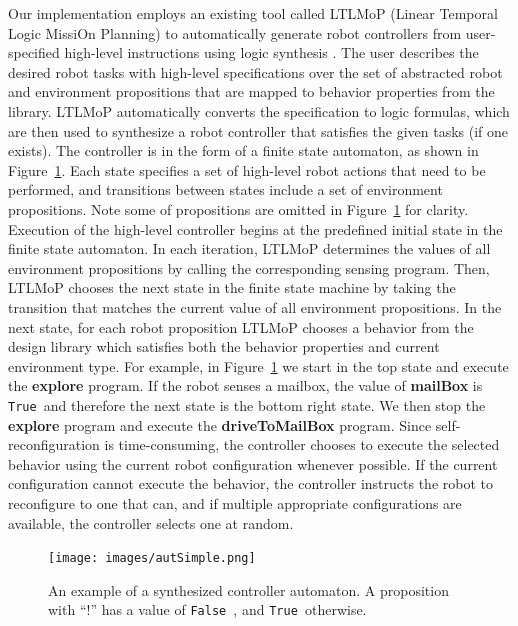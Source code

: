 \documentclass[journal]{IEEEtran}
\newcommand{\lt}{{\tt True }}
\newcommand{\lf}{{\tt False }}
\begin{document}
Our implementation employs an existing tool called LTLMoP (Linear Temporal Logic MissiOn Planning) to automatically generate robot controllers from user-specified high-level instructions using logic synthesis \cite{DBLP:conf/iros/FinucaneJK10,DBLP:journals/trob/Kress-GazitFP09}.
The user describes the desired robot tasks with high-level specifications over the set of abstracted robot and environment propositions that are mapped to behavior properties from the library.
LTLMoP automatically converts the specification to logic formulas, which are then used to synthesize a robot controller that satisfies the given tasks (if one exists).
The controller is in the form of a finite state automaton, as shown in Figure~\ref{fig:autSimple}.
Each state specifies a set of high-level robot actions that need to be performed, and transitions between states include a set of environment propositions.
Note some of propositions are omitted in Figure~\ref{fig:autSimple} for clarity.
Execution of the high-level controller begins at the predefined initial state in the finite state automaton. In each iteration, LTLMoP determines the values of all environment propositions by calling the corresponding sensing program. Then, LTLMoP chooses the next state in the finite state machine by taking the transition that matches the current value of all environment propositions. 
In the next state, for each robot proposition LTLMoP chooses a behavior from the design library which satisfies both the behavior properties and current environment type.
For example, in Figure~\ref{fig:autSimple} we start in the top state and execute the \textbf{explore} program.
If  the robot senses a mailbox, the value of \textbf{mailBox} is \lt and therefore the next state is the bottom right state. We then stop the \textbf{explore} program and execute the \textbf{driveToMailBox} program.
Since self-reconfiguration is time-consuming, the controller chooses to execute the selected behavior using the current robot configuration whenever possible.
If the current configuration cannot execute the behavior, the controller instructs the robot to reconfigure to one that can, and if multiple appropriate configurations are available, the controller selects one at random.

\begin{figure}
\begin{center}
\texttt{[image: images/autSimple.png]}
\caption{An example of a synthesized controller automaton. A proposition with ``!'' has a value of \lf, and \lt otherwise.}
\label{fig:autSimple}
\vspace{-3em}
\end{center}
\end{figure}
\end{document}
